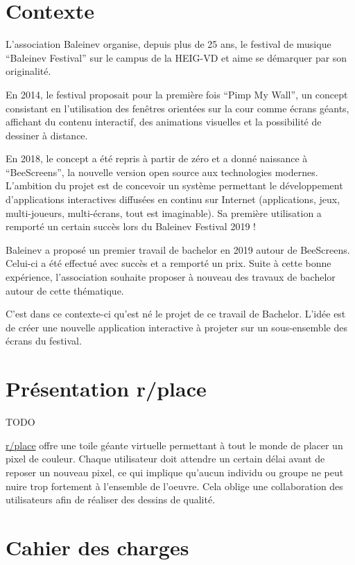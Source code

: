 \section{Contexte}
L'association Baleinev organise, depuis plus de 25 ans, le festival de musique “Baleinev Festival” sur le campus de la HEIG-VD et aime se démarquer par son originalité.

En 2014, le festival proposait pour la première fois “Pimp My Wall”, un concept consistant en l'utilisation des fenêtres orientées sur la cour comme écrans géants, affichant du contenu interactif, des animations visuelles et la possibilité de dessiner à distance.

En 2018, le concept a été repris à partir de zéro et a donné naissance à “BeeScreens”, la nouvelle version open source aux technologies modernes. L'ambition du projet est de concevoir un système permettant le développement d'applications interactives diffusées en continu sur Internet (applications, jeux, multi-joueurs, multi-écrans, tout est imaginable). Sa première utilisation a remporté un certain succès lors du Baleinev Festival 2019 !

Baleinev a proposé un premier travail de bachelor en 2019 autour de BeeScreens. Celui-ci a été effectué avec succès et a remporté un prix. Suite à cette bonne expérience, l'association souhaite proposer à nouveau des travaux de bachelor autour de cette thématique.

C'est dans ce contexte-ci qu'est né le projet de ce travail de Bachelor. L'idée est de créer une nouvelle application interactive à projeter sur un sous-ensemble des écrans du festival.

\section{Présentation r/place}
TODO

\href{https://www.reddit.com/r/place/}{r/place} offre une toile géante virtuelle permettant à tout le monde de placer un pixel de couleur. Chaque utilisateur doit attendre un certain délai avant de reposer un nouveau pixel, ce qui implique qu'aucun individu ou groupe ne peut nuire trop fortement à l'ensemble de l'oeuvre. Cela oblige une collaboration des utilisateurs afin de réaliser des dessins de qualité.

\section{Cahier des charges}

